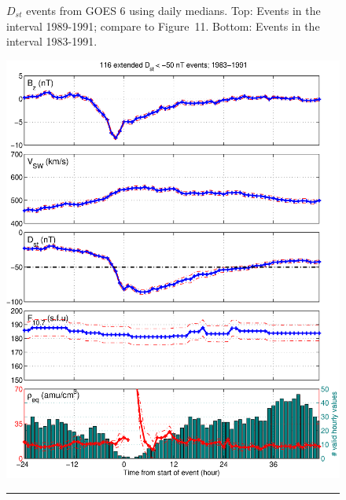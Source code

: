 \documentclass[12pt]{article}
\begin{document}
\begin{figure}[h]
\caption{$D_{st}$ events from GOES 6 using daily medians. Top: Events in the interval 1989-1991; compare to \cite{Takahashi2010} Figure~11. Bottom: Events in the interval 1983-1991.}
\label{fig:DailyAveragedDstEvents}
\end{figure}

\clearpage

\begin{figure}[tp!]
\centering
\includegraphics[scale=0.40]{figures/stormavs-dd12-GOES6.eps}
\\
\rule[1ex]{5cm}{1pt}
\\

\end{figure}
\end{document}
